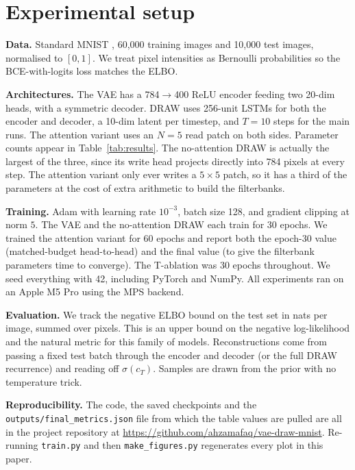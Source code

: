 \documentclass{article}
\begin{document}
\section{Experimental setup}
\label{sec:setup}

\textbf{Data.} Standard MNIST \citep{lecun1998mnist}, 60{,}000 training images
and 10{,}000 test images, normalised to \([0,1]\). We treat pixel intensities
as Bernoulli probabilities so the BCE-with-logits loss matches the ELBO.

\textbf{Architectures.} The VAE has a 784\(\to\)400 ReLU encoder feeding two
20-dim heads, with a symmetric decoder. DRAW uses 256-unit LSTMs for both the
encoder and decoder, a 10-dim latent per timestep, and \(T=10\) steps for the
main runs. The attention variant uses an \(N=5\) read patch on both sides.
Parameter counts appear in Table~\ref{tab:results}. The no-attention DRAW is
actually the largest of the three, since its write head projects directly
into 784 pixels at every step. The attention variant only ever writes a
\(5\times 5\) patch, so it has a third of the parameters at the cost of
extra arithmetic to build the filterbanks.

\textbf{Training.} Adam \citep{kingma2015adam} with learning rate \(10^{-3}\),
batch size 128, and gradient clipping at norm \(5\). The VAE and the
no-attention DRAW each train for 30 epochs. We trained the attention variant
for 60 epochs and report both the epoch-30 value (matched-budget head-to-head)
and the final value (to give the filterbank parameters time to converge). The T-ablation
was 30 epochs throughout. We seed everything with 42, including PyTorch and
NumPy. All experiments ran on an Apple M5 Pro using the MPS backend.

\textbf{Evaluation.} We track the negative ELBO bound on the test set in nats
per image, summed over pixels. This is an upper bound on the negative
log-likelihood and the natural metric for this family of models.
Reconstructions come from passing a fixed test batch through the encoder and
decoder (or the full DRAW recurrence) and reading off \(\sigma(c_T)\).
Samples are drawn from the prior with no temperature trick.

\textbf{Reproducibility.} The code, the saved checkpoints and the
\verb|outputs/final_metrics.json| file from which the table values are pulled
are all in the project repository at
\url{https://github.com/ahzamafaq/vae-draw-mnist}.
Re-running \verb|train.py| and then \verb|make_figures.py| regenerates every
plot in this paper.
\end{document}
